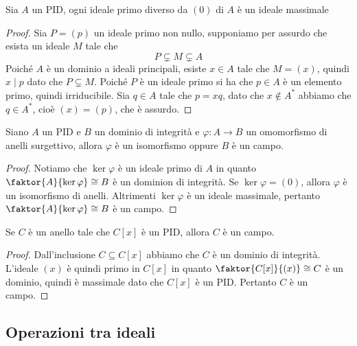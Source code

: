 \documentclass[11pt]{scrartcl}
\begin{document}
\begin{proposition}
    Sia $A$ un PID, ogni ideale primo diverso da $(0)$ di $A$ è un ideale 
    massimale
\end{proposition}

\begin{proof}
    Sia $P = (p)$ un ideale primo non nullo, supponiamo per assurdo che esista
    un ideale $M$ tale che 
    \[
        P \subsetneq M \subsetneq A
    \]
    Poiché $A$ è un dominio a ideali principali, esiste $x \in A$ tale che 
    $M = (x)$, quindi $x \mid p$ dato che $P \subsetneq M$. Poiché $P$ è 
    un ideale primo si ha che $p \in A$ è un elemento primo, quindi 
    irriducibile. Sia $q \in A$ tale che $p = xq$, dato che $x \notin A^*$ abbiamo che 
    $q \in A^*$, cioè $(x) = (p)$, che è assurdo.
\end{proof}

\begin{corollary}
    Siano $A$ un PID e $B$ un dominio di integrità e $\varphi: A \longrightarrow B$
    un omomorfismo di anelli surgettivo, allora $\varphi$ è un isomorfismo
    oppure $B$ è un campo. 
\end{corollary}

\begin{proof}
    Notiamo che $\ker \varphi$ è un ideale primo di $A$ in quanto $\faktor{A}{\ker\varphi}
    \cong B$ è un dominion di integrità. Se $\ker\varphi = (0)$, allora 
    $\varphi$ è un isomorfismo di anelli. Altrimenti $\ker\varphi$ è un ideale
    massimale, pertanto $\faktor{A}{\ker\varphi}\cong B$ è un campo.
\end{proof}

\begin{corollary}
    Se $C$ è un anello tale che $C[x]$ è un PID, allora $C$ è un campo.
\end{corollary}

\begin{proof}
    Dall'inclusione $C \subseteq C[x]$ abbiamo che $C$ è un dominio di integrità.
    L'ideale $(x)$ è quindi primo in $C[x]$ in quanto $\faktor{C[x]}{(x)} \cong C$
    è un dominio, quindi è massimale dato che $C[x]$ è un PID. Pertanto 
    $C$ è un campo.
\end{proof}

\newpage

\subsection{Operazioni tra ideali}
\end{document}
